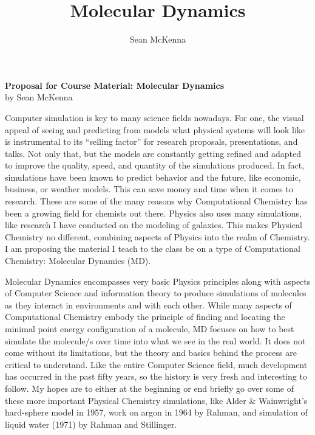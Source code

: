 \documentclass[11pt]{article}
\title{Molecular Dynamics}
\author{Sean McKenna}
\begin{document}
\begin{center}
  \textbf{Proposal for Course Material: Molecular Dynamics} \\
  by Sean McKenna
\end{center}

Computer simulation is key to many science fields nowadays. For one, the visual appeal of seeing and predicting from models what physical systems will look like is instrumental to its ``selling factor'' for research proposals, presentations, and talks. Not only that, but the models are constantly getting refined and adapted to improve the quality, speed, and quantity of the simulations produced. In fact, simulations have been known to predict behavior and the future, like economic, business, or weather models. This can save money and time when it comes to research. These are some of the many reasons why Computational Chemistry has been a growing field for chemists out there. Physics also uses many simulations, like research I have conducted on the modeling of galaxies. This makes Physical Chemistry no different, combining aspects of Physics into the realm of Chemistry. I am proposing the material I teach to the class be on a type of Computational Chemistry: Molecular Dynamics (MD).

Molecular Dynamics encompasses very basic Physics principles along with aspects of Computer Science and information theory to produce simulations of molecules as they interact in environments and with each other. While many aspects of Computational Chemistry embody the principle of finding and locating the minimal point energy configuration of a molecule, MD focuses on how to best simulate the molecule/s over time into what we see in the real world. It does not come without its limitations, but the theory and basics behind the process are critical to understand. Like the entire Computer Science field, much development has occurred in the past fifty years, so the history is very fresh and interesting to follow. My hopes are to either at the beginning or end briefly go over some of these more important Physical Chemistry simulations, like Alder \& Wainwright's hard-sphere model in 1957, work on argon in 1964 by Rahman, and simulation of liquid water (1971) by Rahman and Stillinger.
\end{document}
